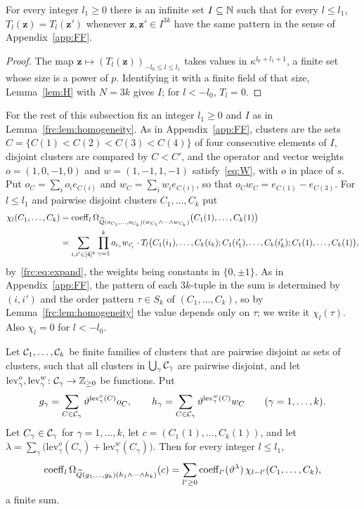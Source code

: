 \begin{lemma}[homogeneity]\label{frc:lem:homogeneity}
For every integer $l_1\ge0$ there is an infinite set $I\subseteq\mathbb N$ such that for every $l\le l_1$,
$T_l(\mathbf z)=T_l(\mathbf z')$ whenever $\mathbf z,\mathbf z'\in I^{3k}$ have the same pattern in the sense of Appendix~\ref{app:FF}.
\end{lemma}

\begin{proof}
The map $\mathbf z\mapsto(T_l(\mathbf z))_{-l_0\le l\le l_1}$ takes values in $\kappa^{l_0+l_1+1}$, a finite set whose
size is a power of $p$. Identifying it with a finite field of that size, Lemma~\ref{lem:H} with $N=3k$ gives $I$; for
$l<-l_0$, $T_l=0$.
\end{proof}

For the rest of this subsection fix an integer $l_1\ge0$ and $I$ as in Lemma~\ref{frc:lem:homogeneity}. As in
Appendix~\ref{app:FF}, clusters are the sets $C=\{C(1)<C(2)<C(3)<C(4)\}$ of four consecutive elements of $I$, disjoint
clusters are compared by $C<C'$, and the operator and vector weights $o=(1,0,-1,0)$ and $w=(1,-1,1,-1)$
satisfy~\eqref{eq:W}, with $o$ in place of $s$. Put $o_C=\sum_io_ie_{C(i)}$ and $w_C=\sum_iw_ie_{C(i)}$, so that
$o_Cw_C=e_{C(1)}-e_{C(3)}$. For $l\le l_1$ and pairwise disjoint clusters $C_1,\dots,C_k$ put
\begin{align*}
 \chi_l(C_1,\dots,C_k)&=\operatorname{coeff}_l\Omega_{\widetilde Q(o_{C_1},\dots,o_{C_k})(w_{C_1}\wedge\dots\wedge w_{C_k})}
 \bigl(C_1(1),\dots,C_k(1)\bigr)\\
 &=\sum_{i,i'\in[4]^k}\prod_{\gamma=1}^ko_{i_\gamma}w_{i'_\gamma}\cdot
 T_l\bigl(C_1(i_1),\dots,C_k(i_k);C_1(i'_1),\dots,C_k(i'_k);C_1(1),\dots,C_k(1)\bigr),
\end{align*}
by~\eqref{frc:eq:expand}, the weights being constants in $\{0,\pm1\}$. As in Appendix~\ref{app:FF}, the pattern of each
$3k$\nobreakdash-tuple in the sum is determined by $(i,i')$ and the order pattern $\tau\in S_k$ of $(C_1,\dots,C_k)$, so
by Lemma~\ref{frc:lem:homogeneity} the value depends only on $\tau$; we write it $\chi_l(\tau)$. Also $\chi_l=0$ for
$l<-l_0$.

\begin{lemma}\label{frc:lem:clusters}
Let $\mathcal{C}_1,\dots,\mathcal{C}_k$ be finite families of clusters that are pairwise disjoint as sets of clusters, such that all
clusters in $\bigcup_\gamma\mathcal{C}_\gamma$ are pairwise disjoint, and let $\mathrm{lev}^o_\gamma,\mathrm{lev}^w_\gamma\colon
\mathcal{C}_\gamma\to\mathbb Z_{\ge0}$ be functions. Put
\[
 g_\gamma=\sum_{C\in\mathcal{C}_\gamma}\vartheta^{\mathrm{lev}^o_\gamma(C)}o_C,\qquad
 h_\gamma=\sum_{C\in\mathcal{C}_\gamma}\vartheta^{\mathrm{lev}^w_\gamma(C)}w_C\qquad(\gamma=1,\dots,k).
\]
Let $C_\gamma\in\mathcal{C}_\gamma$ for $\gamma=1,\dots,k$, let $c=(C_1(1),\dots,C_k(1))$, and let
$\lambda=\sum_\gamma\bigl(\mathrm{lev}^o_\gamma(C_\gamma)+\mathrm{lev}^w_\gamma(C_\gamma)\bigr)$. Then for every integer
$l\le l_1$,
\[
 \operatorname{coeff}_l\Omega_{\widetilde Q(g_1,\dots,g_k)(h_1\wedge\dots\wedge h_k)}(c)
 =\sum_{l'\ge0}\operatorname{coeff}_{l'}(\vartheta^\lambda)\,\chi_{l-l'}(C_1,\dots,C_k),
\]
a finite sum.
\end{lemma}

